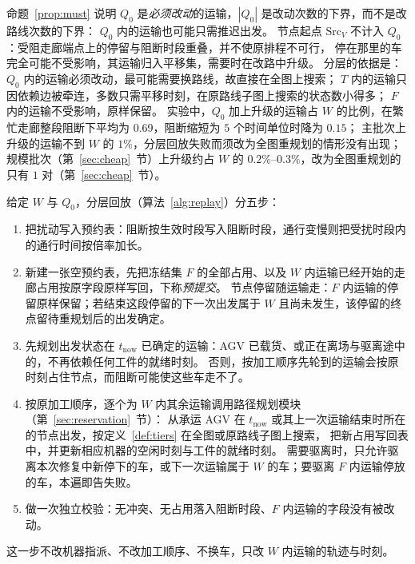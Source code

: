\documentclass[manuscript,screen,review]{acmart}
\newcommand{\TierReplanShare}{0.69}      %
\begin{document}
命题~\ref{prop:must} 说明 \(Q_0\) 是\emph{必须改动}的运输，\(|Q_0|\) 是改动次数的下界，而不是改路线次数的下界：
\(Q_0\) 内的运输也可能只需推迟出发。
节点起点 \(\mathrm{Src}_V\) 不计入 \(Q_0\)：受阻走廊端点上的停留与阻断时段重叠，并不使原排程不可行，
停在那里的车完全可能不受影响，其运输归入平移集，需要时在改路中升级。
分层的依据是：\(Q_0\) 内的运输必须改动，最可能需要换路线，故直接在全图上搜索；
\(T\) 内的运输只因依赖边被牵连，多数只需平移时刻，在原路线子图上搜索的状态数小得多；
\(F\) 内的运输不受影响，原样保留。
实验中，\(Q_0\) 加上升级的运输占 \(W\) 的比例，在繁忙走廊整段阻断下平均为 \TierReplanShare，阻断缩短为 \(5\) 个时间单位时降为 \(0.15\)；
主批次上升级的运输不到 \(W\) 的 \(1\%\)，分层回放失败而须改为全图重规划的情形没有出现；
规模批次（第~\ref{sec:cheap}~节）上升级约占 \(W\) 的 \(0.2\%\)--\(0.3\%\)，改为全图重规划的只有 \(1\) 对（第~\ref{sec:cheap}~节）。

给定 \(W\) 与 \(Q_0\)，分层回放（算法~\ref{alg:replay}）分五步：
\begin{enumerate}[label=(\arabic*),leftmargin=2em,itemsep=0.15em]
\item 把扰动写入预约表：阻断按生效时段写入阻断时段，通行变慢则把受扰时段内的通行时间按倍率加长。
\item 新建一张空预约表，先把冻结集 \(F\) 的全部占用、以及 \(W\) 内运输已经开始的走廊占用按原字段原样写回，下称\emph{预提交}。
节点停留随运输走：\(F\) 内运输的停留原样保留；若结束这段停留的下一次出发属于 \(W\) 且尚未发生，该停留的终点留待重规划后的出发确定。
\item 先规划出发状态在 \(t_{\mathrm{now}}\) 已确定的运输：AGV 已载货、或正在离场与驱离途中的，不再依赖任何工件的就绪时刻。
否则，按加工顺序先轮到的运输会按原时刻占住节点，而阻断可能使这些车走不了。
\item 按原加工顺序，逐个为 \(W\) 内其余运输调用路径规划模块（第~\ref{sec:reservation}~节）：
从承运 AGV 在 \(t_{\mathrm{now}}\) 或其上一次运输结束时所在的节点出发，按定义~\ref{def:tiers} 在全图或原路线子图上搜索，
把新占用写回表中，并更新相应机器的空闲时刻与工件的就绪时刻。
需要驱离时，只允许驱离本次修复中新停下的车，或下一次运输属于 \(W\) 的车；要驱离 \(F\) 内运输停放的车，本遍即告失败。
\item 做一次独立校验：无冲突、无占用落入阻断时段、\(F\) 内运输的字段没有被改动。
\end{enumerate}
这一步不改机器指派、不改加工顺序、不换车，只改 \(W\) 内运输的轨迹与时刻。
\end{document}
